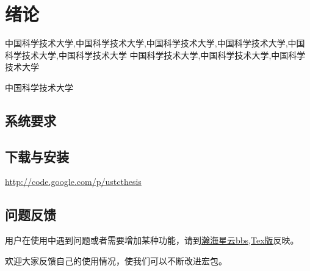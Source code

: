 ﻿
\chapter{绪论}
\label{chap:introduction}

中国科学技术大学,中国科学技术大学,中国科学技术大学,中国科学技术大学,中国科学技术大学,中国科学技术大学
中国科学技术大学,中国科学技术大学,中国科学技术大学


中国科学技术大学

\section{系统要求}



\section{下载与安装}


\href{http://code.google.com/p/ustcthesis}{http://code.google.com/p/ustcthesis}


\section{问题反馈}

用户在使用中遇到问题或者需要增加某种功能，请到\href{http://bbs.ustc.edu.cn/cgi/go?cgi=bbsdoc&board=TeX}{瀚海星云bbs,Tex版}反映。


欢迎大家反馈自己的使用情况，使我们可以不断改进宏包。
